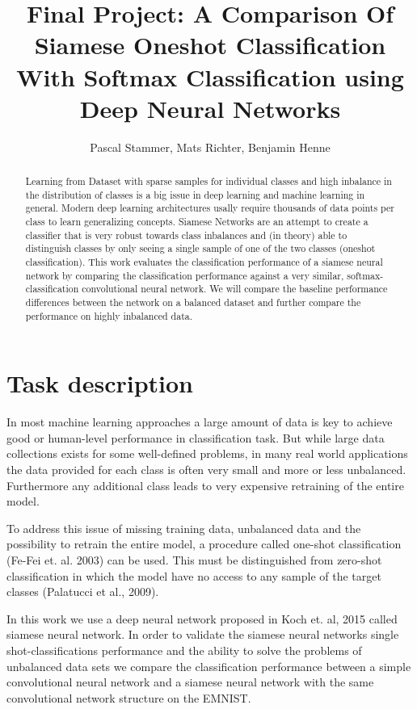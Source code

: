 \documentclass[a4paper,pt12]{article}
\begin{document}
\author{Pascal Stammer, Mats Richter, Benjamin Henne}
\title{Final Project: A Comparison Of Siamese Oneshot Classification With Softmax Classification using Deep Neural Networks}

\maketitle

\begin{abstract}
Learning from Dataset with sparse samples for individual classes and high inbalance in the distribution of classes is a big issue in deep learning and machine learning in general. Modern deep learning architectures usally require thousands of data points per class to learn generalizing concepts. Siamese Networks are an attempt to create a classifier that is very robust towards class inbalances and (in theory) able to distinguish classes by only seeing a single sample of one of the two classes (oneshot classification). This work evaluates the classification performance of a siamese neural network by comparing the classification performance against a very similar, softmax-classification convolutional neural network. We will compare the baseline performance differences between the network on a balanced dataset and further compare the performance on highly inbalanced data. 

\end{abstract}

\section{Task description}
In most machine learning approaches a large amount of data is key to achieve good or human-level performance in classification task.
But while large data collections exists for some well-defined problems, in many real world applications the data provided for
each class is often very small and more or less unbalanced. Furthermore any additional class leads to very expensive retraining of the entire model.

To address this issue of missing training data, unbalanced data and the possibility to retrain the entire model,
a procedure called one-shot classification (Fe-Fei et. al. 2003) can be used. This must be distinguished from zero-shot
classification in which the model have no access to any sample of the target classes (Palatucci et al., 2009).

In this work we use a deep neural network proposed in Koch et. al, 2015 called siamese neural network. In order to validate the siamese neural networks
single shot-classifications performance and the ability to solve the problems of unbalanced data sets we compare the classification
performance between a simple convolutional neural network and a siamese neural network with the same convolutional network structure on
the EMNIST.
\end{document}
